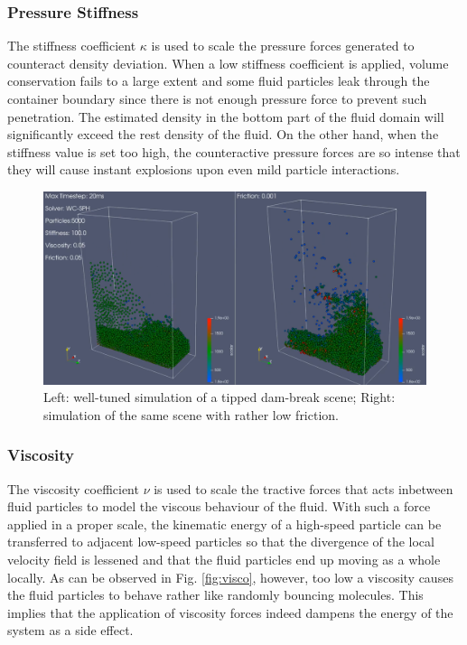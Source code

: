 \documentclass[
	11pt, 
	DIV10,
	ngerman,
	a4paper, 
	oneside, 
	headings=normal, 
	captions=tableheading,
	final, 
	numbers=noenddot
]{scrartcl}
\begin{document}
\subsubsection{Pressure Stiffness}

The stiffness coefficient $ \kappa $ is used to scale the pressure forces generated to counteract density deviation. When a low stiffness coefficient is applied, volume conservation fails to a large extent and some fluid particles leak through the container boundary since there is not enough pressure force to prevent such penetration. The estimated density in the bottom part of the fluid domain will significantly exceed the rest density of the fluid. On the other hand, when the stiffness value is set too high, the counteractive pressure forces are so intense that they will cause instant explosions upon even mild particle interactions.

\begin{figure}
    \centering
    \includegraphics[width=.6\textwidth]{pics/wcsph_friction.png}
    \caption{Left: well-tuned simulation of a tipped dam-break scene; Right: simulation of the same scene with rather low friction.}
    \label{fig:frict}
\end{figure}

\subsubsection{Viscosity}

The viscosity coefficient $ \nu $ is used to scale the tractive forces that acts inbetween fluid particles to model the viscous behaviour of the fluid. With such a force applied in a proper scale, the kinematic energy of a high-speed particle can be transferred to adjacent low-speed particles so that the divergence of the local velocity field is lessened and that the fluid particles end up moving as a whole locally. As can be observed in Fig. \ref{fig:visco}, however, too low a viscosity causes the fluid particles to behave rather like randomly bouncing molecules. This implies that the application of viscosity forces indeed dampens the energy of the system as a side effect.
\end{document}
